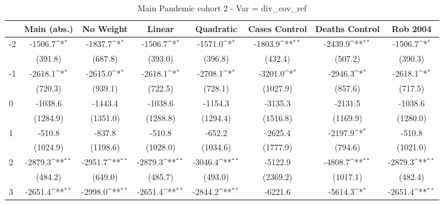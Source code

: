 \documentclass{article}
\begin{document}
{
\def\sym#1{\ifmmode^{#1}\else\(^{#1}\)\fi}
\begin{longtable}{l*{7}{c}}
\caption{Main Pandemic cohort 2 - Var = div\_cov\_ref}\\
\hline\hline\endfirsthead\hline\endhead\hline\endfoot\endlastfoot
                &\multicolumn{1}{c}{Main (abs.)}&\multicolumn{1}{c}{No Weight}&\multicolumn{1}{c}{Linear}&\multicolumn{1}{c}{Quadratic}&\multicolumn{1}{c}{Cases Control}&\multicolumn{1}{c}{Deaths Control}&\multicolumn{1}{c}{Rob 2004}\\
\hline
-2              &  -1506.7\sym{*}  &  -1837.7\sym{*}  &  -1506.7\sym{*}  &  -1571.0\sym{*}  &  -1803.9\sym{**} &  -2439.9\sym{**} &  -1506.7\sym{*}  \\
                &  (391.8)         &  (687.8)         &  (393.0)         &  (396.8)         &  (432.4)         &  (507.2)         &  (390.3)         \\
-1              &  -2618.1\sym{*}  &  -2615.0\sym{*}  &  -2618.1\sym{*}  &  -2708.1\sym{*}  &  -3201.0\sym{*}  &  -2946.3\sym{*}  &  -2618.1\sym{*}  \\
                &  (720.3)         &  (939.1)         &  (722.5)         &  (728.1)         & (1027.9)         &  (857.6)         &  (717.5)         \\
0               &  -1038.6         &  -1443.4         &  -1038.6         &  -1154.3         &  -3135.3         &  -2131.5         &  -1038.6         \\
                & (1284.9)         & (1351.0)         & (1288.8)         & (1294.4)         & (1516.8)         & (1169.9)         & (1280.0)         \\
1               &   -510.8         &   -837.8         &   -510.8         &   -652.2         &  -2625.4         &  -2197.9\sym{*}  &   -510.8         \\
                & (1024.9)         & (1198.6)         & (1028.0)         & (1034.6)         & (1777.9)         &  (794.6)         & (1021.0)         \\
2               &  -2879.3\sym{**} &  -2951.7\sym{**} &  -2879.3\sym{**} &  -3046.4\sym{**} &  -5122.9         &  -4808.7\sym{**} &  -2879.3\sym{**} \\
                &  (484.2)         &  (649.0)         &  (485.7)         &  (493.0)         & (2369.2)         & (1017.1)         &  (482.4)         \\
3               &  -2651.4\sym{**} &  -2998.0\sym{**} &  -2651.4\sym{**} &  -2844.2\sym{**} &  -6221.6         &  -5614.3\sym{*}  &  -2651.4\sym{**} \\

\end{longtable}}
\end{document}
